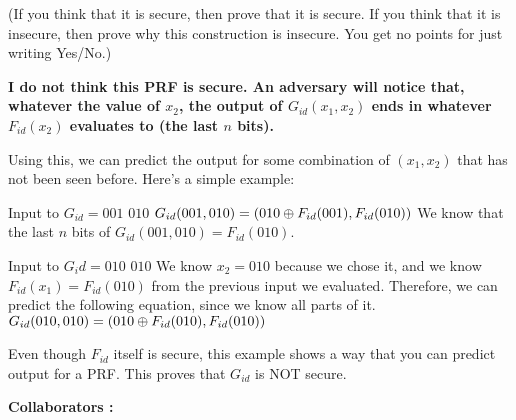 \documentclass[11pt]{article}
\begin{document}
\begin{enumerate}
(If you think that it is secure, then prove that it is secure.
If you think that it is insecure, then prove why this construction is insecure. 
You get no points for just writing Yes/No.)

    {\bfseries
    I do not think this PRF is secure. An adversary will notice that, whatever the value of $x_2$, the output of $G_{id}(x_1, x_2)$ ends in whatever $F_{id}(x_2)$ evaluates to (the last $n$ bits).\newline

    Using this, we can predict the output for some combination of $(x_1, x_2)$ that has not been seen before. Here's a simple example: \newline

    Input to $G_{id} = 001$ $010$ \newline
    $G_{id}(001, 010) = ( 010 \oplus F_{id}(001), F_{id}(010) )$ \newline
    We know that the last $n$ bits of $G_{id}(001, 010) = F_{id}(010)$. \newline

    Input to $G_id = 010$ $010$ \newline
    We know $x_2 = 010$ because we chose it, and we know $F_{id}(x_1) = F_{id}(010)$ from the previous input we evaluated. Therefore, we can predict the following equation, since we know all parts of it. \newline
    $G_{id}(010, 010) = ( 010 \oplus F_{id}(010), F_{id}(010) )$ \newline

    Even though $F_{id}$ itself is secure, this example shows a way that you can predict output for a PRF. This proves that $G_{id}$ is NOT secure.
    }


\newpage
\end{enumerate}
{\bfseries Collaborators :} \newline 
\end{document}
